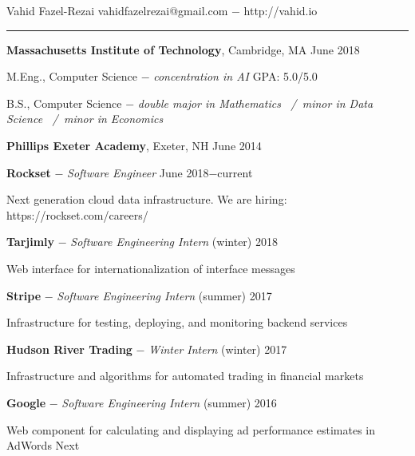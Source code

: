 \documentclass[11pt]{article}
\newcommand{\msection}[1]{\vspace{1em}\marginnote{#1}} %
\newcommand{\bt}[1]{\textbf{#1}} %
\newcommand{\gap}[0]{\vspace{0.8em}} %
\newcommand{\dash}[0]{ $-$ } %
\newcommand{\tabsep}[0]{\, / \,} %
\begin{document}

{\Huge Vahid Fazel-Rezai} \hfill  vahidfazelrezai@gmail.com\dash http://vahid.io

\vspace{0.4em}

\hspace{-1.2in}\rule{7.9in}{0.2em}

\vspace{-0.2em}



\msection{Education}

\bt{Massachusetts Institute of Technology}, Cambridge, MA \hfill June 2018

M.Eng., Computer Science \dash \emph{concentration in AI} \hfill GPA: 5.0/5.0

B.S., Computer Science \dash \emph{double major in Mathematics \tabsep minor in Data Science \tabsep minor in Economics}

\gap

\bt{Phillips Exeter Academy}, Exeter, NH \hfill June 2014



\msection{Work}

\bt{Rockset}\dash \emph{Software Engineer} \hfill June 2018$-$current

Next generation cloud data infrastructure. We are hiring: https://rockset.com/careers/

\gap

\bt{Tarjimly}\dash \emph{Software Engineering Intern} \hfill (winter) 2018

Web interface for internationalization of interface messages

\gap

\bt{Stripe}\dash \emph{Software Engineering Intern} \hfill (summer) 2017

Infrastructure for testing, deploying, and monitoring backend services

\gap

\bt{Hudson River Trading}\dash \emph{Winter Intern} \hfill (winter) 2017

Infrastructure and algorithms for automated trading in financial markets

\gap

\bt{Google}\dash \emph{Software Engineering Intern} \hfill (summer) 2016

Web component for calculating and displaying ad performance estimates in AdWords Next

\gap
\end{document}
